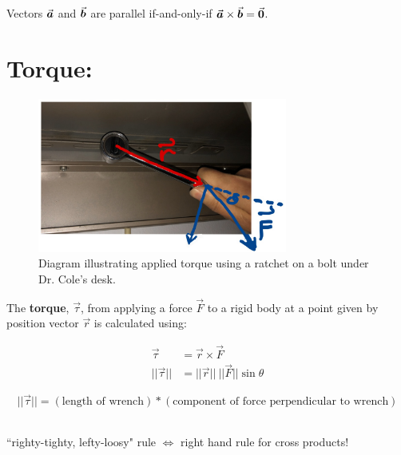 Vectors \(\a\) and \(\b\) are parallel if-and-only-if \(\a \times \b = \vec{0}\).\\


\vspace*{.1in}



\section*{Torque: }

\begin{figure}[!h]
\centering
\includegraphics[height=2in]{Ch2s4-torque3.png}
\caption{Diagram illustrating applied torque using a ratchet on a bolt under Dr. Cole's desk.}
\end{figure}


\hspace*{.2in}

The \textbf{torque}, \(\vec{\tau}\), from applying a force \(\vec{F}\) to a rigid body at a point given by position vector \(\vec{r}\) is  calculated using:

\begin{align*}
\vec{\tau} &= \vec{r} \times \vec{F} \\
||\vec{\tau}|| &= ||\vec{r}||\ ||\vec{F}|| \sin\theta
\end{align*}

\[ ||\vec{\tau}|| = (\text{length of wrench})*(\text{component of force perpendicular to wrench}) \]

~\\

 ``righty-tighty, lefty-loosy" rule \(\Leftrightarrow\) right hand rule for cross products!

\vspace*{.5in}

